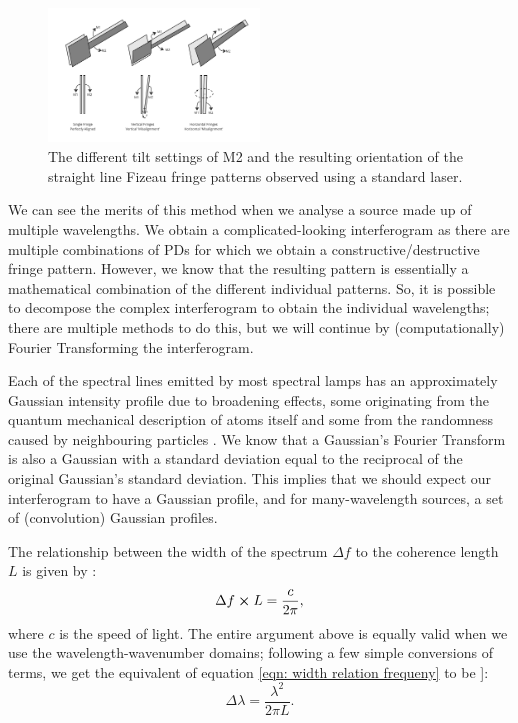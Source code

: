 \documentclass[journal]{Imperial_lab_report}
\begin{document}
\begin{figure}[h]
\centering
\captionsetup{font=footnotesize}
    \includegraphics[width = 0.5\textwidth]{alignment.png}
    \caption{The different tilt settings of M2 and the resulting orientation of the straight line Fizeau fringe patterns observed using a standard laser.}
    \label{fig:alignment}
\vspace{-20pt}
\end{figure}

We can see the merits of this method when we analyse a source made up of multiple wavelengths. We obtain a complicated-looking interferogram as there are multiple combinations of PDs for which we obtain a constructive/destructive fringe pattern. However, we know that the resulting pattern is essentially a mathematical combination of the different individual patterns. So, it is possible to decompose the complex interferogram to obtain the individual wavelengths; there are multiple methods to do this, but we will continue by (computationally) Fourier Transforming the interferogram.

Each of the spectral lines emitted by most spectral lamps has an approximately Gaussian intensity profile due to broadening effects, some originating from the quantum mechanical description of atoms itself and some from the randomness caused by neighbouring particles \cite{line_spectra_shape}. We know that a Gaussian's Fourier Transform is also a Gaussian with a standard deviation equal to the reciprocal of the original Gaussian's standard deviation. This implies that we should expect our interferogram to have a Gaussian profile, and for many-wavelength sources, a set of (convolution) Gaussian profiles.


The relationship between the width of the spectrum $\Delta f$ to the coherence length $L$ is given by \cite{coh_length_eq1}\cite{lab_manual}:
\begin{equation}
    \Delta f \cross L = \frac{c}{2\pi}, \label{eqn: width relation frequeny}
\end{equation}
where $c$ is the speed of light. The entire argument above is equally valid when we use the wavelength-wavenumber domains; following a few simple conversions of terms, we get the equivalent of equation \eqref{eqn: width relation frequeny} to be ]\cite{lab_manual}:
\begin{equation}
    \Delta\lambda = \frac{\lambda^2}{2\pi L}. \label{eqn: width relation wavelength}
\end{equation}
\end{document}
